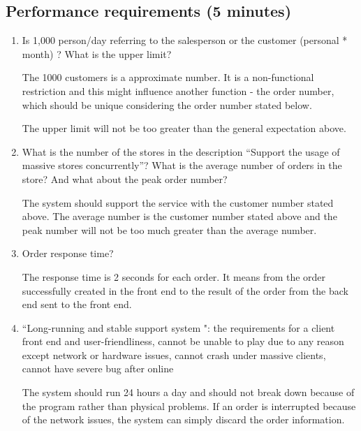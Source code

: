 \documentclass[a4paper]{report}
\begin{document}
 \subsection{Performance requirements (5 minutes)}
 \begin{enumerate}
\item Is 1,000 person/day referring to the salesperson or the customer (personal * month) ? What is the upper limit? 
\par
The 1000 customers is a approximate number. It is a non-functional restriction and this might influence another function - the order number, which should be unique considering the order number stated below.
\par
The upper limit will not be too greater than the general expectation above.
\item What is the number of the stores in the description ``Support the usage of massive stores concurrently''?  What is the average number of orders in the store? And what about the peak order number? 
\par
The system should support the service with the customer number stated above. The average number is the customer number stated above and the peak number will not be too much greater than the average number.
\item Order response time? 
\par 
The response time is 2 seconds for each order. It means from the order successfully created in the front end to the result of the order from the back end sent to the front end.
\item ``Long-running and stable support system ": the requirements for a client front end and user-friendliness, cannot be unable to play due to any reason except network or hardware issues, cannot crash under massive clients, cannot have severe bug after online
\par
The system should run 24 hours a day and should not break down because of the program rather than physical problems. If an order is interrupted because of the network issues, the system can simply discard the order information.
\end{enumerate}
\end{document}
